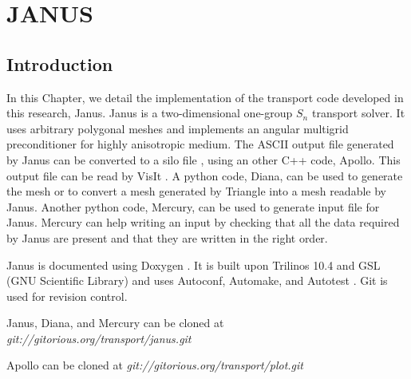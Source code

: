 \chapter{\uppercase{Janus}}
\label{janus_chapter}
\section{Introduction}
In this Chapter, we detail the implementation of the transport code developed
in this research, Janus. Janus is a two-dimensional one-group $S_n$ transport
solver. It uses arbitrary polygonal meshes and implements an angular multigrid
preconditioner for highly anisotropic medium. The ASCII output file generated
by Janus can be converted to a silo file \cite{silo}, using an other C++ code,
Apollo. This output file can be read by VisIt \cite{visit}. A python code, 
Diana, can be used to generate the mesh or to convert a mesh generated by Triangle
\cite{triangle} into a mesh readable by Janus. Another python code, Mercury,
can be used to generate input file for Janus. Mercury can help writing an
input by checking that all the data required by Janus are present and that
they are written in the right order. 

Janus is documented using Doxygen \cite{doxygen}. It is built upon Trilinos
10.4 \cite{trilinos} and GSL (GNU Scientific Library) \cite{gsl} and uses
Autoconf, Automake, and Autotest \cite{autoconf,automake}. Git \cite{git} 
is used for revision control. 

Janus, Diana, and Mercury can be cloned at 
\emph{\hbox{git://gitorious.org/transport/janus.git}} 

Apollo can be cloned at \emph{\hbox{git://gitorious.org/transport/plot.git}}

